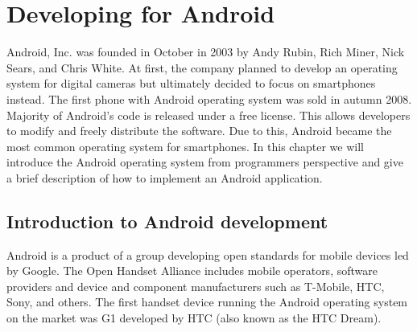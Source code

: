 







\chapter{Developing for Android}

Android, Inc\@. was founded in October in 2003 by Andy Rubin, Rich Miner, Nick Sears, and Chris White. 
At first, the company planned to develop an operating system for digital cameras %
but ultimately %
decided to focus on smartphones instead. %
The first phone with Android operating system was sold in autumn 2008.
Majority of Android's code is released under a free license. 
This allows developers to modify and freely distribute the software.
Due to this, Android became the most common operating system for smartphones.
In this chapter we will introduce the Android operating system from programmers perspective and give a brief description of how to implement an Android application.

\section{Introduction to Android development}

Android is a product of a group developing open standards for mobile devices led by Google.
The Open Handset Alliance includes mobile operators, software providers and device and component manufacturers such as
T-Mobile, HTC, Sony, and others.
The first handset device running the Android operating system on the market was G1 developed by HTC (also known as the HTC Dream). 

